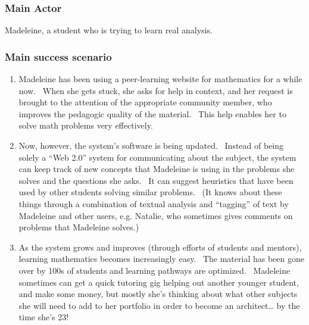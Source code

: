 \subsubsection{Main Actor}

Madeleine, a student who is trying to learn real analysis.

\subsubsection{Main success scenario}

\begin{enumerate}
\item
  Madeleine has been using a peer-learning website for mathematics for a
  while now. ~When she gets stuck, she asks for help in context, and her
  request is brought to the attention of the appropriate community
  member, who improves the pedagogic quality of the material. ~This help
  enables her to solve math problems very effectively.
\item
  Now, however, the system's software is being updated. ~Instead of
  being solely a ``Web 2.0'' system for communicating about the subject,
  the system can keep track of new concepts that Madeleine is using in
  the problems she solves and the questions she asks. ~It can suggest
  heuristics that have been used by other students solving similar
  problems. ~(It knows about these things through a combination of
  textual analysis and ``tagging'' of text by Madeleine and other users,
  e.g. Natalie, who sometimes gives comments on problems that Madeleine
  solves.)
\item
  As the system grows and improves (through efforts of students and
  mentors), learning mathematics becomes increasingly easy. ~The
  material has been gone over by 100s of students and learning pathways
  are optimized. ~Madeleine sometimes can get a quick tutoring gig
  helping out another younger student, and make some money, but mostly
  she's thinking about what other subjects she will need to add to her
  portfolio in order to become an architect\ldots{} by the time she's
  23!
\end{enumerate}
